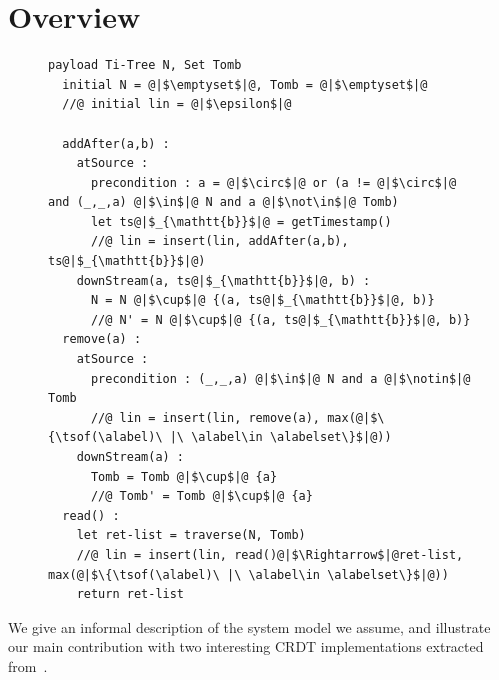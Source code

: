 \section{Overview}
\label{sec:overview}

\begin{figure}[t]
\begin{lstlisting}[basicstyle=\ttfamily\scriptsize,caption={\vspace{-1mm}Replicated Growing Array (RGA) CRDT pseudo-code.},captionpos=b,label={lst:rga}]
  payload Ti-Tree N, Set Tomb
  initial N = @|$\emptyset$|@, Tomb = @|$\emptyset$|@
  //@ initial lin = @|$\epsilon$|@

  addAfter(a,b) :
    atSource :
      precondition : a = @|$\circ$|@ or (a != @|$\circ$|@ and (_,_,a) @|$\in$|@ N and a @|$\not\in$|@ Tomb)
      let ts@|$_{\mathtt{b}}$|@ = getTimestamp()
      //@ lin = insert(lin, addAfter(a,b), ts@|$_{\mathtt{b}}$|@)
    downStream(a, ts@|$_{\mathtt{b}}$|@, b) :
      N = N @|$\cup$|@ {(a, ts@|$_{\mathtt{b}}$|@, b)}
      //@ N' = N @|$\cup$|@ {(a, ts@|$_{\mathtt{b}}$|@, b)}
  remove(a) :
    atSource :
      precondition : (_,_,a) @|$\in$|@ N and a @|$\notin$|@ Tomb
      //@ lin = insert(lin, remove(a), max(@|$\{\tsof(\alabel)\ |\ \alabel\in \alabelset\}$|@))
    downStream(a) :
      Tomb = Tomb @|$\cup$|@ {a}
      //@ Tomb' = Tomb @|$\cup$|@ {a}
  read() :
    let ret-list = traverse(N, Tomb)
    //@ lin = insert(lin, read()@|$\Rightarrow$|@ret-list, max(@|$\{\tsof(\alabel)\ |\ \alabel\in \alabelset\}$|@))
    return ret-list
\end{lstlisting}
\vspace{-5mm}
\end{figure}

We give an informal description of the system model
we assume, and illustrate our main contribution with two
interesting CRDT implementations extracted from~\cite{AttiyaBGMYZ16,ShapiroPBZ11}.

